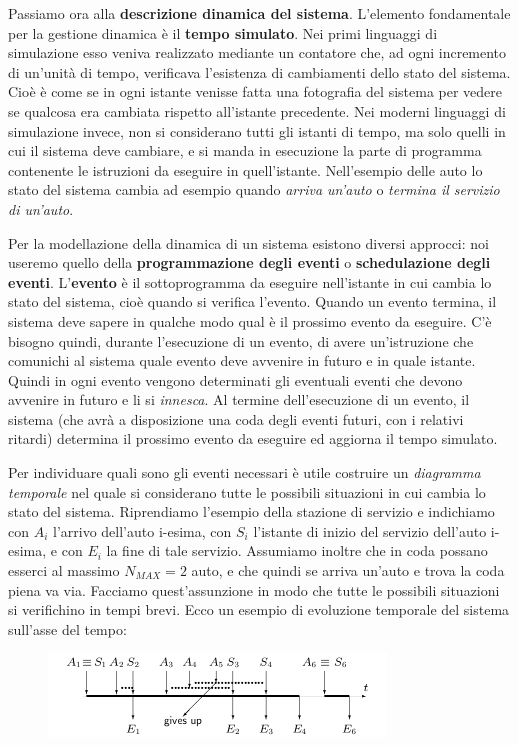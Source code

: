 \documentclass[11pt]{book}
\begin{document}
Passiamo ora alla {\bf descrizione dinamica del sistema}. L'elemento
fondamentale per la gestione dinamica \`e il {\bf tempo simulato}. Nei
primi linguaggi di simulazione esso veniva realizzato mediante un
contatore che, ad ogni incremento di un'unit\`a di tempo, verificava
l'esistenza di cambiamenti dello stato del sistema. Cio\`e \`e come se
in ogni istante venisse fatta una fotografia del sistema per vedere se
qualcosa era cambiata rispetto all'istante precedente. Nei moderni
linguaggi di simulazione invece, non si considerano tutti gli istanti
di tempo, ma solo quelli in cui il sistema deve cambiare, e si manda
in esecuzione la parte di programma contenente le istruzioni da
eseguire in quell'istante. Nell'esempio delle auto lo stato del
sistema cambia ad esempio quando {\em arriva un'auto} o {\em termina
  il servizio di un'auto}.

Per la modellazione della dinamica di un sistema esistono diversi
approcci: noi useremo quello della {\bf programmazione degli eventi} o
{\bf schedulazione degli eventi}. L'{\bf evento} \`e il sottoprogramma
da eseguire nell'istante in cui cambia lo stato del sistema, cio\`e
quando si verifica l'evento. Quando un evento termina, il sistema deve
sapere in qualche modo qual \`e il prossimo evento da eseguire. C'\`e
bisogno quindi, durante l'esecuzione di un evento, di avere
un'istruzione che comunichi al sistema quale evento deve avvenire in
futuro e in quale istante. Quindi in ogni evento vengono determinati
gli eventuali eventi che devono avvenire in futuro e li si {\em
  innesca}. Al termine dell'esecuzione di un evento, il sistema (che
avr\`a a disposizione una coda degli eventi futuri, con i relativi
ritardi) determina il prossimo evento da eseguire ed aggiorna il tempo
simulato. 

Per individuare quali sono gli eventi necessari \`e utile costruire un
{\em diagramma temporale} nel quale si considerano tutte le possibili
situazioni in cui cambia lo stato del sistema. Riprendiamo l'esempio
della stazione di servizio e indichiamo con $A_i$ l'arrivo dell'auto
i-esima, con $S_i$ l'istante di inizio del servizio dell'auto i-esima,
e con $E_i$ la fine di tale servizio. Assumiamo inoltre che in coda
possano esserci al massimo $N_{MAX}=2$ auto, e che quindi se arriva
un'auto e trova la coda piena va via. Facciamo quest'assunzione in
modo che tutte le possibili situazioni si verifichino in tempi
brevi. Ecco un esempio di evoluzione temporale del sistema sull'asse
del tempo:

\begin{figure}[H]
  \centering
  \includegraphics[width=0.8\textwidth]{images/cap11fig5.png}
\end{figure}
\end{document}
